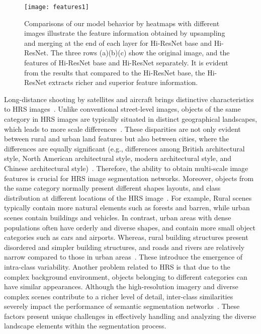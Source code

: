 \documentclass[journal]{IEEEtran}
\begin{document}
\begin{figure}[t]
    \centering
    \texttt{[image: features1]}
    \caption{Comparisons of our model behavior by heatmaps with different images illustrate the feature information obtained by upsampling and merging at the end of each layer for Hi-ResNet base and Hi-ResNet. The three rows (a)(b)(c) show the original image, and the features of Hi-ResNet base and Hi-ResNet separately. It is evident from the results that compared to the Hi-ResNet base, the Hi-ResNet extracts richer and superior feature information.}
    \label{fig:features}
\end{figure}

Long-distance shooting by satellites and aircraft brings distinctive characteristics to HRS images~\cite{demir2018challenge, marcos2018land}.
Unlike conventional street-level images, objects of the same category in HRS images are typically situated in distinct geographical landscapes, which leads to more scale differences~\cite{kemker2018algorithms, volpi2015semantic}.
These disparities are not only evident between rural and urban land features but also between cities, where the differences are equally significant (e.g., differences among British architectural style, North American architectural style, modern architectural style, and Chinese architectural style)~\cite{xia2018dota}. Therefore, the ability to obtain multi-scale image features is crucial for HRS image segmentation networks.
Moreover, objects from the same category normally present different shapes layouts, and class distribution at different locations of the HRS image~\cite{boguszewski2021landcover}. For example, Rural scenes typically contain more natural elements such as forests and barren, while urban scenes contain buildings and vehicles. In contrast, urban areas with dense populations often have orderly and diverse shapes, and contain more small object categories such as cars and airports. Whereas, rural building structures present disordered and simpler building structures, and roads and rivers are relatively narrow compared to those in urban areas~\cite{wang2021loveda}. These introduce the emergence of intra-class variability. Another problem related to HRS is that due to the complex background environment, objects belonging to different categories can have similar appearances. Although the high-resolution imagery and diverse complex scenes contribute to a richer level of detail, inter-class similarities severely impact the performance of semantic segmentation networks~\cite{zheng2020foreground, kampffmeyer2016semantic, bai2021object}.
These factors present unique challenges in effectively handling and analyzing the diverse landscape elements within the segmentation process.
\end{document}
